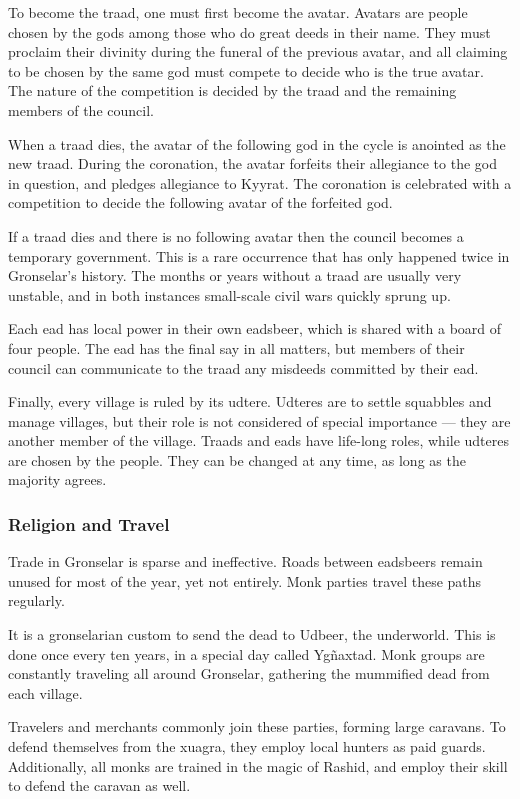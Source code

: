 \begin{linenumbers}
To become the traad, one must first become the avatar.
Avatars are people chosen by the gods among those who do great deeds in their name.
They must proclaim their divinity during the funeral of the previous avatar, and all claiming to be chosen by the same god must compete to decide who is the true avatar.
The nature of the competition is decided by the traad and the remaining members of the council.

When a traad dies, the avatar of the following god in the cycle is anointed as the new traad.
During the coronation, the avatar forfeits their allegiance to the god in question, and pledges allegiance to Kyyrat.
The coronation is celebrated with a competition to decide the following avatar of the forfeited god.

If a traad dies and there is no following avatar then the council becomes a temporary government.
This is a rare occurrence that has only happened twice in Gronselar's history.
The months or years without a traad are usually very unstable, and in both instances small-scale civil wars quickly sprung up.

Each ead has local power in their own eadsbeer, which is shared with a board of four people.
The ead has the final say in all matters, but members of their council can communicate to the traad any misdeeds committed by their ead.

Finally, every village is ruled by its udtere.
Udteres are to settle squabbles and manage villages, but their role is not considered of special importance --- they are another member of the village.
Traads and eads have life-long roles, while udteres are chosen by the people.
They can be changed at any time, as long as the majority agrees.

\subsubsection{Religion and Travel}
Trade in Gronselar is sparse and ineffective.
Roads between eadsbeers remain unused for most of the year, yet not entirely.
Monk parties travel these paths regularly.

It is a gronselarian custom to send the dead to Udbeer, the underworld.
This is done once every ten years, in a special day called Yg\~naxtad.
Monk groups are constantly traveling all around Gronselar, gathering the mummified dead from each village.

Travelers and merchants commonly join these parties, forming large caravans.
To defend themselves from the xuagra, they employ local hunters as paid guards.
Additionally, all monks are trained in the magic of Rashid, and employ their skill to defend the caravan as well.


\end{linenumbers}
